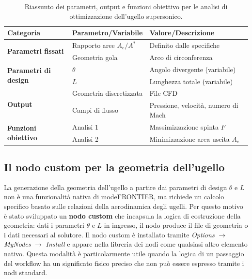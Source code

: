 \begin{table}[H]
    \centering
    \begin{tabular}{|l|l|l|}
    \hline
    \textbf{Categoria} & \textbf{Parametro/Variabile} & \textbf{Valore/Descrizione} \\
    \hline
    \multirow{2}{*}{\textbf{Parametri fissati}} & Rapporto aree $A_e/A^*$ & Definito dalle specifiche \\
    & Geometria gola & Arco di circonferenza \\
    \hline
    \multirow{2}{*}{\textbf{Parametri di design}} & $\theta$ & Angolo divergente (variabile) \\
    & $L$ & Lunghezza totale (variabile) \\
    \hline
    \multirow{2}{*}{\textbf{Output}} & Geometria discretizzata & File CFD \\
    & Campi di flusso & Pressione, velocità, numero di Mach \\
    \hline
    \multirow{2}{*}{\textbf{Funzioni obiettivo}} & Analisi 1 & Massimizzazione spinta $F$ \\
    & Analisi 2 & Minimizzazione area uscita $A_e$ \\
    \hline
    \end{tabular}
    \caption{Riassunto dei parametri, output e funzioni obiettivo per le
    analisi di ottimizzazione dell'ugello supersonico.}
    \label{tab:opt_summary}
\end{table}

\subsection{Il nodo custom per la geometria dell'ugello}

La generazione della geometria dell'ugello a partire dai parametri di
design $\theta$ e $L$ non è una funzionalità nativa di modeFRONTIER,
ma richiede un calcolo specifico basato sulle relazioni della
aerodinamica degli ugelli.
Per questo motivo è stato sviluppato un \textbf{nodo custom} che
incapsula la logica di costruzione della geometria: dati i parametri
$\theta$ e $L$ in ingresso, il nodo produce il file di geometria o i
dati necessari al solutore.
Il nodo custom è installato tramite \textit{Options} $\to$
\textit{MyNodes} $\to$ \textit{Install} e appare nella libreria dei
nodi come qualsiasi altro elemento nativo.
Questa modalità è particolarmente utile quando la logica di un passaggio
del workflow ha un significato fisico preciso che non può essere espresso
tramite i nodi standard.

